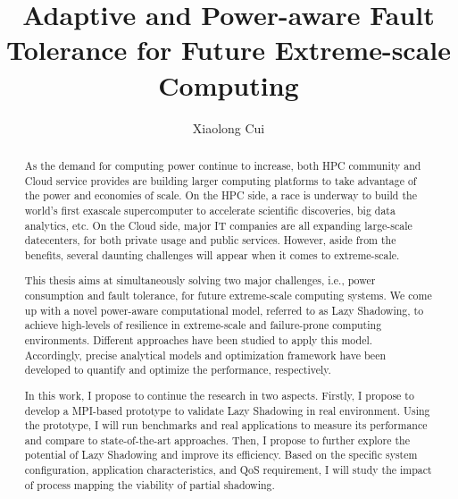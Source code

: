 \documentclass[driverfallback=dvipdfmx,final]{pittetd}
\title[Adaptive and Power-aware Fault Tolerance for Future Extreme-scale Computing]
{Adaptive and Power-aware Fault Tolerance for Future Extreme-scale Computing}
\author{Xiaolong Cui}
\begin{document}
\maketitle
%
\makecommittee
\copyrightpage                     %
\begin{abstract}
As the demand for computing power continue to increase, both HPC community and Cloud service provides are building larger computing platforms to take advantage of the power and economies of scale. On the HPC side, %
a race is underway to build the world's first exascale supercomputer 
to accelerate scientific discoveries, big data analytics, etc. On the Cloud side, major IT companies are all expanding large-scale datecenters, for both private usage and public services. However, aside from the benefits, several daunting challenges will appear when it comes to extreme-scale.

This thesis aims at simultaneously solving two major challenges, i.e., power consumption and fault tolerance, for future extreme-scale computing systems. We come up with a novel power-aware computational model, referred to as Lazy Shadowing, to achieve high-levels of resilience in extreme-scale and failure-prone computing environments. Different approaches have been studied to apply this model. Accordingly, precise analytical models and optimization framework have been developed to quantify and optimize the performance, respectively. 

In this work, I propose to continue the research in two aspects. Firstly, I propose to develop a MPI-based prototype to validate Lazy Shadowing in real environment. Using the prototype, I will run benchmarks and real applications to measure its performance and compare to state-of-the-art approaches. Then, I propose to further explore the potential of Lazy Shadowing and improve its efficiency. Based on the specific system configuration, application characteristics, and QoS requirement, I will study 
the impact of process mapping the viability of partial shadowing.     

\end{abstract}
\end{document}
